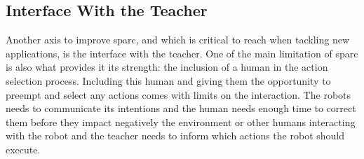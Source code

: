
\subsection{Interface With the Teacher}

Another axis to improve \gls{sparc}, and which is critical to reach when tackling new applications, is the interface with the teacher. One of the main limitation of \gls{sparc} is also what provides it its strength: the inclusion of a human in the action selection process. Including this human and giving them the opportunity to preempt and select any actions comes with limits on the interaction. The robots needs to communicate its intentions and the human needs enough time to correct them before they impact negatively the environment or other humans interacting with the robot and the teacher needs to inform which actions the robot should execute. %

